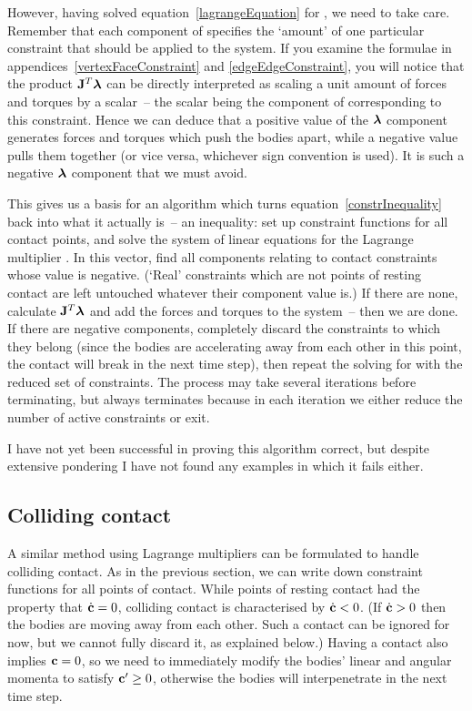 However, having solved equation~\ref{lagrangeEquation} for \ve{\lambda}, we need to take care.
Remember that each component of \ve{\lambda} specifies the `amount' of one particular constraint
that should be applied to the system. If you examine the formulae in
appendices~\ref{vertexFaceConstraint} and \ref{edgeEdgeConstraint}, you will notice that the
product $\m{J}^T\ve{\lambda}$ can be directly interpreted as scaling a unit amount of forces and
torques by a scalar~-- the scalar being the component of \ve{\lambda} corresponding to this
constraint. Hence we can deduce that a positive value of the $\ve{\lambda}$ component generates
forces and torques which push the bodies apart, while a negative value pulls them together (or
vice versa, whichever sign convention is used). It is such a negative $\ve{\lambda}$ component
that we must avoid.

This gives us a basis for an algorithm which turns equation~\ref{constrInequality} back into what
it actually is~-- an inequality: set up constraint functions for all contact points, and solve the
system of linear equations for the Lagrange multiplier \ve{\lambda}. In this vector, find all
components relating to contact constraints whose value is negative. (`Real' constraints which are
not points of resting contact are left untouched whatever their \ve{\lambda} component value is.)
If there are none, calculate $\m{J}^T\ve{\lambda}$ and add the forces and torques to the system~--
then we are done. If there are negative components, completely discard the constraints to which
they belong (since the bodies are accelerating away from each other in this point, the contact
will break in the next time step), then repeat the solving for \ve{\lambda} with the reduced set
of constraints. The process may take several iterations before terminating, but always terminates
because in each iteration we either reduce the number of active constraints or exit.

I have not yet been successful in proving this algorithm correct, but despite extensive pondering
I have not found any examples in which it fails either.

\subsection{Colliding contact\label{collidingContact}}

A similar method using Lagrange multipliers can be formulated to handle colliding contact. As in
the previous section, we can write down constraint functions  for all points of contact.
While points of resting contact had the property that $\dot{\ve{c}} = 0$, colliding contact is
characterised by $\dot{\ve{c}} < 0$. (If $\dot{\ve{c}} > 0$ then the bodies are moving away from
each other. Such a contact can be ignored for now, but we cannot fully discard it, as explained
below.) Having a contact also implies $\ve{c} = 0$, so we need to immediately modify the bodies'
linear and angular momenta to satisfy $\ve{c}' \ge 0$, otherwise the bodies will interpenetrate
in the next time step.

